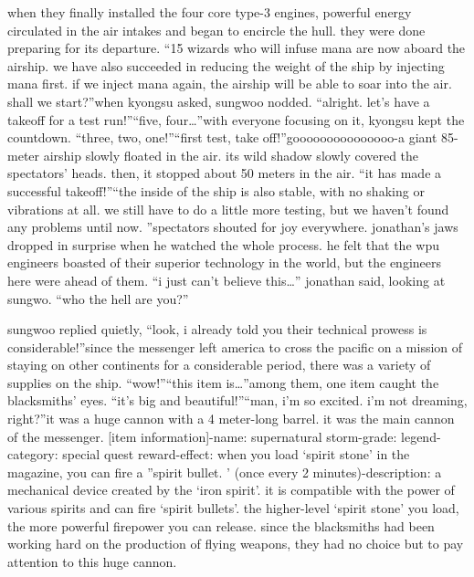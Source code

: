 when they finally installed the four core type-3 engines, powerful energy circulated in the air intakes and began to encircle the hull.
 they were done preparing for its departure.
“15 wizards who will infuse mana are now aboard the airship.
 we have also succeeded in reducing the weight of the ship by injecting mana first.
 if we inject mana again, the airship will be able to soar into the air.
 shall we start?”when kyongsu asked, sungwoo nodded.
“alright.
 let’s have a takeoff for a test run!”“five, four…”with everyone focusing on it, kyongsu kept the countdown.
“three, two, one!”“first test, take off!”gooooooooooooooo-a giant 85-meter airship slowly floated in the air.
 its wild shadow slowly covered the spectators’ heads.
 then, it stopped about 50 meters in the air.
“it has made a successful takeoff!”“the inside of the ship is also stable, with no shaking or vibrations at all.
 we still have to do a little more testing, but we haven’t found any problems until now.
”spectators shouted for joy everywhere.
jonathan’s jaws dropped in surprise when he watched the whole process.
 he felt that the wpu engineers boasted of their superior technology in the world, but the engineers here were ahead of them.
“i just can’t believe this…” jonathan said, looking at sungwo.
 “who the hell are you?”

sungwoo replied quietly, “look, i already told you their technical prowess is considerable!”since the messenger left america to cross the pacific on a mission of staying on other continents for a considerable period, there was a variety of supplies on the ship.
“wow!”“this item is…”among them, one item caught the blacksmiths’ eyes.
“it’s big and beautiful!”“man, i’m so excited.
 i’m not dreaming, right?”it was a huge cannon with a 4 meter-long barrel.
 it was the main cannon of the messenger.
[item information]-name: supernatural storm-grade: legend-category: special quest reward-effect: when you load ‘spirit stone’ in the magazine, you can fire a ”spirit bullet.
’ (once every 2 minutes)-description: a mechanical device created by the ‘iron spirit’.
 it is compatible with the power of various spirits and can fire ‘spirit bullets’.
 the higher-level ‘spirit stone’ you load, the more powerful firepower you can release.
since the blacksmiths had been working hard on the production of flying weapons, they had no choice but to pay attention to this huge cannon.


 